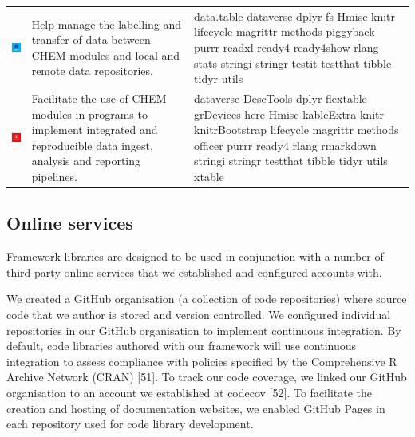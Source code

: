 \documentclass[
]{article}
\begin{document}
\begin{table}
\begin{tabular}[t]{l>{\raggedright\arraybackslash}m{20em}>{\raggedright\arraybackslash}m{20em}}
\includegraphics[valign=M,width=1.9cm,raise=4mm]{ready4use_logo.png} & Help manage the labelling and transfer of data between CHEM modules and local and remote data repositories. & data.table dataverse dplyr fs Hmisc knitr lifecycle magrittr methods piggyback purrr readxl ready4 ready4show rlang stats stringi stringr testit testthat tibble tidyr utils\\
\addlinespace
\includegraphics[valign=M,width=1.9cm,raise=4mm]{ready4show_logo.png} & Facilitate the use of CHEM modules in programs to implement integrated and reproducible data ingest, analysis and reporting pipelines. & dataverse DescTools dplyr flextable grDevices here Hmisc kableExtra knitr knitrBootstrap lifecycle magrittr methods officer purrr ready4 rlang rmarkdown stringi stringr testthat tibble tidyr utils xtable\\
\bottomrule
\end{tabular}
\end{table}

\hypertarget{online-services}{%
\subsection{Online services}\label{online-services}}

Framework libraries are designed to be used in conjunction with a number of third-party online services that we established and configured accounts with.

We created a GitHub organisation (a collection of code repositories) where source code that we author is stored and version controlled. We configured individual repositories in our GitHub organisation to implement continuous integration. By default, code libraries authored with our framework will use continuous integration to assess compliance with policies specified by the Comprehensive R Archive Network (CRAN) {[}51{]}. To track our code coverage, we linked our GitHub organisation to an account we established at codecov {[}52{]}. To facilitate the creation and hosting of documentation websites, we enabled GitHub Pages in each repository used for code library development.
\end{document}
